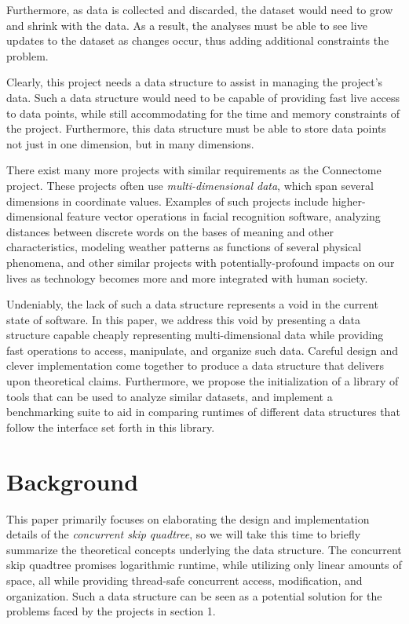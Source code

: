 \documentclass[10pt]{article}
\begin{document}
Furthermore, as data is collected and discarded, the dataset would need to grow and shrink with the data. As a result, the analyses must be able to see live updates to the dataset as changes occur, thus adding additional constraints the problem.

Clearly, this project needs a data structure to assist in managing the project's data. Such a data structure would need to be capable of providing fast live access to data points, while still accommodating for the time and memory constraints of the project. Furthermore, this data structure must be able to store data points not just in one dimension, but in many dimensions.

There exist many more projects with similar requirements as the Connectome project. These projects often use \textit{multi-dimensional data}, which span several dimensions in coordinate values. Examples of such projects include higher-dimensional feature vector operations in facial recognition software, analyzing distances between discrete words on the bases of meaning and other characteristics, modeling weather patterns as functions of several physical phenomena, and other similar projects with potentially-profound impacts on our lives as technology becomes more and more integrated with human society.

Undeniably, the lack of such a data structure represents a void in the current state of software. In this paper, we address this void by presenting a data structure capable cheaply representing multi-dimensional data while providing fast operations to access, manipulate, and organize such data. Careful design and clever implementation come together to produce a data structure that delivers upon theoretical claims. Furthermore, we propose the initialization of a library of tools that can be used to analyze similar datasets, and implement a benchmarking suite to aid in comparing runtimes of different data structures that follow the interface set forth in this library.

\section{Background}

This paper primarily focuses on elaborating the design and implementation details of the \textit{concurrent skip quadtree}, so we will take this time to briefly summarize the theoretical concepts underlying the data structure. The concurrent skip quadtree promises logarithmic runtime, while utilizing only linear amounts of space, all while providing thread-safe concurrent access, modification, and organization. Such a data structure can be seen as a potential solution for the problems faced by the projects in section 1.
\end{document}
